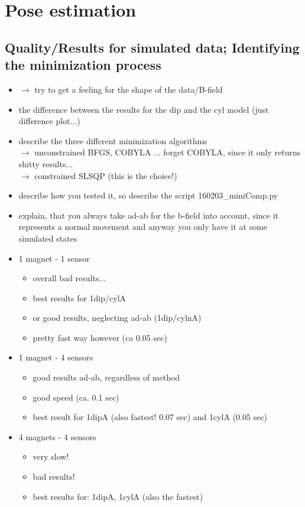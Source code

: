\section{Pose estimation} \label{sec:estimationRes}

\subsection{Quality/Results for simulated data; Identifying the minimization process} \label{subsec:resSim}

\begin{itemize}
\item $ \rightarrow $ try to get a feeling for the shape of the data/B-field
\item the difference between the results for the dip and the cyl model (just difference plot...)

\item describe the three different minimization algorithms \\
	$ \rightarrow $ unconstrained BFGS, COBYLA ... forget COBYLA, since it only returns shitty results...\\
	$ \rightarrow $ constrained SLSQP (this is the choice!)
	
\item describe how you tested it, so describe the script 160203\_miniComp.py
\item explain, that you always take ad-ab for the b-field into account, since it represents a normal movement and anyway you only have it at some simulated states

\item 1 magnet - 1 sensor
	\begin{itemize}
	\item overall bad results...
	\item best results for 1dip/cylA
	\item or good results, neglecting ad-ab (1dip/cylnA)
	\item pretty fast way however (ca 0.05 sec)
	\end{itemize}
\item 1 magnet - 4 sensors
	\begin{itemize}
	\item good results ad-ab, regardless of method	
	\item good speed (ca. 0.1 sec)
	\item best result for 1dipA (also fastest! 0.07 sec) and 1cylA (0.05 sec)
	\end{itemize}
\item 4 magnets - 4 sensors
	\begin{itemize}
	\item very slow! 
	\item bad results!
	\item best results for: 1dipA, 1cylA (also the fastest)
	\end{itemize}
	

\end{itemize}
